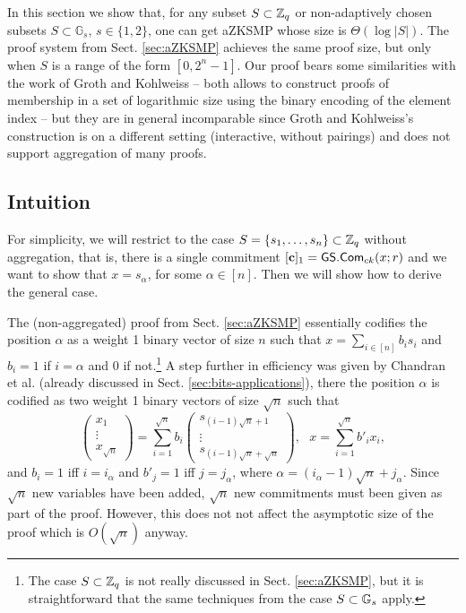 In this section we show that, for any subset $S\subset\mathbb{Z}_q$ or non-adaptively chosen subsets $S\subset\mathbb{G}_s$, $s\in\{1,2\}$, one can get aZKSMP whose size is $\Theta(\log|S|)$. The proof system from Sect. \ref{sec:aZKSMP} achieves the same proof size, but only when $S$ is a range of the form $[0,2^n-1]$. Our proof bears some similarities with the work of Groth and Kohlweiss \cite{EC:GroKoh15} -- both allows to construct proofs of membership in a set of logarithmic size using the binary encoding of the element index -- but they are in general incomparable since Groth and Kohlweiss's construction is on a different setting (interactive, without pairings) and does not support aggregation of many proofs.

\subsection{Intuition}

For simplicity, we will restrict to the case $S=\{s_1,\ldots,s_n\}\subset\mathbb{Z}_q$ without aggregation, that is, there is a single commitment $[\mathbf{c}]_1={\mathsf{GS}}.\mathsf{Com}_{ck}(x;r)$ and we want to show that $x=s_\alpha$, for some $\alpha\in[n]$. Then we will show how to derive the general case.

The (non-aggregated) proof from Sect. \ref{sec:aZKSMP} essentially codifies the position $\alpha$ as a weight 1 binary vector of size $n$ such that $x=\sum_{i\in[n]}b_is_i$ and
$b_i=1$ if $i=\alpha$ and $0$ if not.\footnote{The case $S\subset\mathbb{Z}_q$ is not really discussed in Sect. \ref{sec:aZKSMP}, but it is straightforward that the same techniques from the case $S\subset\mathbb{G}_s$ apply.} A step further in efficiency was given by Chandran et al. \cite{ICALP:ChaGroSah07} (already discussed in Sect. \ref{sec:bits-applications}), there the position $\alpha$ is codified as two weight 1 binary vectors of size $\sqrt{n}$ such that
$$
\begin{pmatrix}
x_1\\\vdots\\x_{\sqrt{n}}
\end{pmatrix}
=\sum_{i=1}^{\sqrt{n}}b_i
\begin{pmatrix}
s_{(i-1)\sqrt{n}+1}\\\vdots\\s_{(i-1)\sqrt{n}+\sqrt{n}}
\end{pmatrix},
\text{ } x=\sum_{i=1}^{\sqrt{n}}b'_ix_i,$$
and $b_i=1$ iff $i=i_\alpha$ and $b'_j=1$ iff $j=j_\alpha$, where $\alpha=(i_\alpha-1)\sqrt{n}+j_\alpha$. Since $\sqrt{n}$ new variables have been added, $\sqrt{n}$ new commitments must been given as part of the proof. However, this does not not affect the asymptotic size of the proof which is $O(\sqrt{n})$ anyway.


